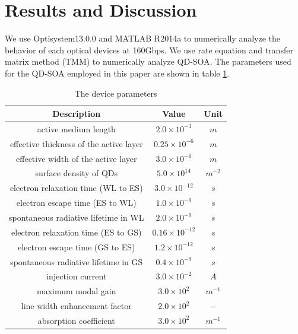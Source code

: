 \documentclass[twocolumn,a4paper]{article}
\begin{document}
\newpage

\section{Results and Discussion}
We use Optisystem13.0.0 and MATLAB R2014a to numerically analyze the behavior of each optical devices at 160Gbps. We use rate equation and transfer matrix method (TMM) to numerically analyze QD-SOA{\cite{Rostami}}. The parameters used for the QD-SOA employed in this paper are shown in table {\ref{table:param}}.

\renewcommand{\arraystretch}{1.5}
\begin{table}[htbp]
\begin{center}
 \small
 \caption{The device parameters}
 \label{table:param}
 \begin{tabular}{c c c}
  \hline
  Description & Value & Unit \\
  \hline
  active medium length & $2.0 \times 10^{-3}$ & $m$ \\
  effective thickness of the active layer & $ 0.25 \times 10^{-6}$ & $m$ \\
  effective width of the active layer & $ 3.0 \times 10^{-6}$ & $m$ \\
  surface density of QDs & $ 5.0 \times 10^{14}$ & $m^{-2}$ \\
  electron relaxation time (WL to ES) & $ 3.0 \times 10^{-12}$ & $s$ \\
  electron escape time (ES to WL) & $ 1.0 \times 10^{-9}$ & $s$ \\
  spontaneous radiative lifetime in WL & $ 2.0 \times 10^{-9}$ & $s$ \\
  electron relaxation time (ES to GS) & $ 0.16 \times 10^{-12}$ & $s$ \\
  electron escape time (GS to ES) & $ 1.2 \times 10^{-12}$ & $s$ \\
  spontaneous radiative lifetime in GS & $ 0.4 \times 10^{-9}$ & $s$ \\
  injection current & $ 3.0 \times 10^{-2}$ & $A$ \\
  maximum modal gain & $ 3.0 \times 10^{2}$ & $m^{-1}$ \\
  line width enhancement factor & $ 2.0 \times 10^{2}$ & $-$ \\
  absorption coefficient & $ 3.0 \times 10^{2}$ & $m^{-1}$ \\
  \hline
\end{tabular}
\end{center}
\end{table}
\renewcommand{\arraystretch}{1.0}
\end{document}
